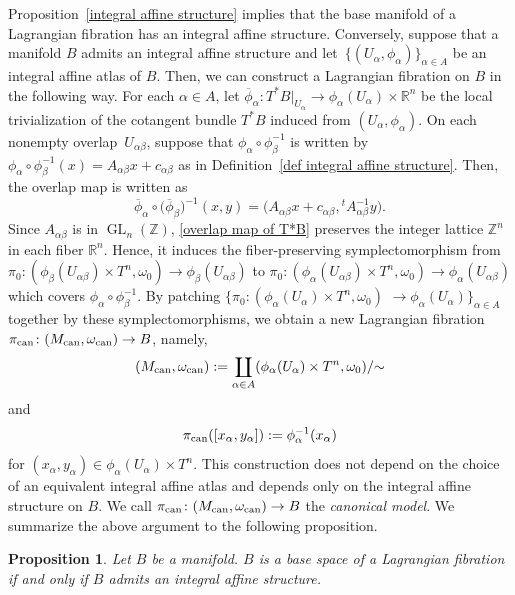 \documentclass[pdftex]{sigma}
\numberwithin{equation}{section}
\newtheorem{Proposition}[Theorem]{Proposition}
 { \theoremstyle{definition}
\newtheorem{Definition}[Theorem]{Definition}
\newtheorem{Note}[Theorem]{Note}
\newtheorem{Example}[Theorem]{Example}
\newtheorem{Remark}[Theorem]{Remark} }
\newcommand{\R}{\mathbb{R}}
\newcommand{\Z}{\mathbb{Z}}
\def\GL{\operatorname{GL}}
\begin{document}
Proposition~\ref{integral affine structure} implies that the base manifold of a Lagrangian fibration has an integral affine structure.
Conversely, suppose that a manifold $B$ admits an integral affine structure and let~$\{ (U_\alpha,\phi_\alpha)\}_{\alpha\in A}$ be an integral affine atlas of $B$. Then, we can construct a Lagrangian fibration on $B$ in the following way. For each $\alpha \in A$, let $\overline \phi_\alpha\colon T^*B|_{U_\alpha}\to \phi_\alpha(U_\alpha) \times \R^n$ be the local trivialization of the cotangent bundle $T^*B$ induced from $(U_\alpha,\phi_\alpha)$. On each nonempty overlap~$U_{\alpha\beta}$, suppose that $\phi_{\alpha}\circ \phi_{\beta}^{-1}$ is written by $\phi_{\alpha}\circ \phi_{\beta}^{-1}(x)=A_{\alpha\beta}x+c_{\alpha\beta}$ as in Definition~\ref{def integral affine structure}. Then, the overlap map is written as
\begin{equation}\label{overlap map of T*B}
\overline\phi_\alpha\circ \bigl(\overline\phi_\beta\bigr)^{-1}(x,y)=\bigl(A_{\alpha\beta}x+c_{\alpha\beta},{}^tA^{-1}_{\alpha\beta}y\bigr).
\end{equation}
Since $A_{\alpha\beta}$ is in $\GL_n(\Z)$, \eqref{overlap map of T*B} preserves the integer lattice $\Z^n$ in each fiber $\R^n$. Hence, it induces the fiber-preserving symplectomorphism from $\pi_0\colon(\phi_\beta(U_{\alpha\beta})\times T^n,\omega_0)\to \phi_\beta(U_{\alpha\beta})$ to $\pi_0\colon (\phi_\alpha(U_{\alpha\beta})\times T^n,\omega_0)\to \phi_\alpha(U_{\alpha\beta})$ which covers $\phi_{\alpha}\circ \phi_{\beta}^{-1}$. By patching $\{\pi_0\colon (\phi_{\alpha}(U_\alpha)\times T^n, \omega_0)$ $\to \phi_\alpha(U_\alpha)\}_{\alpha\in A}$ together by these symplectomorphisms, we obtain a new Lagrangian fibration $\pi_{\rm can}\colon (M_{\rm can},\omega_{\rm can})\to B$, namely,
\[
(M_{\rm can},\omega_{\rm can}):=\coprod_{\alpha\in A}(\phi_\alpha(U_\alpha)\times T^n, \omega_0)/{\sim}
\]
and
\[
\pi_{\rm can}([x_\alpha,y_\alpha]):=\phi_\alpha^{-1}(x_\alpha)
\]
for $(x_\alpha,y_\alpha)\in \phi_\alpha(U_\alpha)\times T^n$. This construction does not depend on the choice of an equivalent integral affine atlas and depends only on the integral affine structure on $B$.
We call $\pi_{\rm can}\colon (M_{\rm can},\omega_{\rm can})\to B$ the {\it canonical model}.
%
We summarize the above argument to the following proposition.
\begin{Proposition}\label{necessary and sufficient condition}
Let $B$ be a manifold. $B$ is a base space of a Lagrangian fibration if and only if $B$ admits an integral affine structure.
\end{Proposition}
\end{document}
